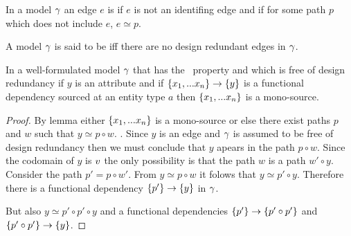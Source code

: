 \begin{newtt}
\begin{definition}
In a model $\gamma$ an edge $e$ is  if $e$ is not an identifing edge and if for some path $p$
which does not include $e$, $e \simeq p$.
\end{definition}

\begin{definition}
A model $\gamma$ is said to be  iff there are no design redundant edges in $\gamma$.
\end{definition}

\begin{lemma}
 
In a well-formulated model $\gamma$ that has the \fdfactoring\ property and which is free of design redundancy if $y$ is an attribute and if $\left\{x_1,...x_n\right\} \rightarrow \left\{y\right\}$
is a functional dependency sourced at an entity type $a$ then $\left\{x_1,...x_n\right\}$ is a mono-source.
\end{lemma}
\begin{proof}
By lemma  either $\left\{x_1,...x_n\right\}$ is a mono-source or else there exist paths $p$ and $w$ such that $y \simeq p \circ w$. 
 . Since $y$ is an edge and $\gamma$ is assumed to be free of design redundancy then we must conclude
that $y$ apears in the path $p \circ w$. Since the codomain of $y$ is $v$ the only possibility is that the path $w$ 
is a path $w' \circ y$. Consider the path $p' = p \circ w'$. From $y \simeq p \circ w$ it folows that $y \simeq p' \circ y$.
Therefore there is a functional dependency $\left\{p'\right\} \rightarrow \left\{y\right\}$ in $\gamma$. 

But also $y \simeq p' \circ p' \circ y$ and a functional dependencies $\left\{p'\right\} \rightarrow \left\{p' \circ p'\right\}$ and $\left\{p' \circ p'\right\} \rightarrow \left\{y\right\}$.
\end{proof}
\end{newtt}


